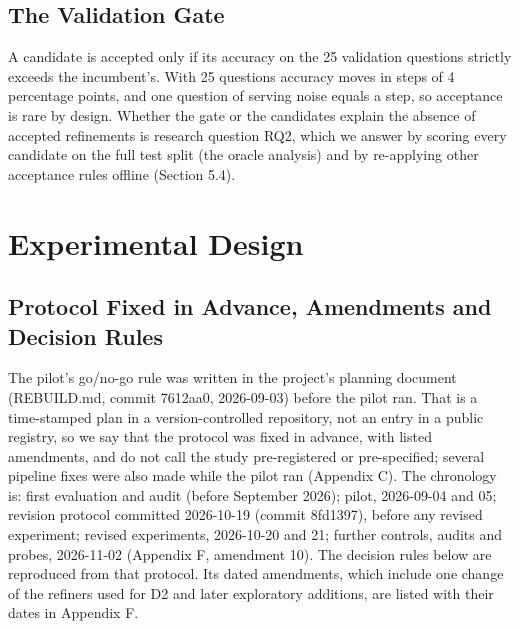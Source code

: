 \documentclass{ieeeaccess}
\begin{document}
\subsection{The Validation Gate}

A candidate is accepted only if its accuracy on the 25 validation questions strictly exceeds the incumbent's. With 25 questions accuracy moves in steps of 4 percentage points, and one question of serving noise equals a step, so acceptance is rare by design. Whether the gate or the candidates explain the absence of accepted refinements is research question RQ2, which we answer by scoring every candidate on the full test split (the oracle analysis) and by re-applying other acceptance rules offline (Section 5.4).

\section{Experimental Design}

\subsection{Protocol Fixed in Advance, Amendments and Decision Rules}

The pilot's go/no-go rule was written in the project's planning document (REBUILD.md, commit 7612aa0, 2026-09-03) before the pilot ran. That is a time-stamped plan in a version-controlled repository, not an entry in a public registry, so we say that the protocol was fixed in advance, with listed amendments, and do not call the study pre-registered or pre-specified; several pipeline fixes were also made while the pilot ran (Appendix C). The chronology is: first evaluation and audit (before September 2026); pilot, 2026-09-04 and 05; revision protocol committed 2026-10-19 (commit 8fd1397), before any revised experiment; revised experiments, 2026-10-20 and 21; further controls, audits and probes, 2026-11-02 (Appendix F, amendment 10). The decision rules below are reproduced from that protocol. Its dated amendments, which include one change of the refiners used for D2 and later exploratory additions, are listed with their dates in Appendix F.
\end{document}
